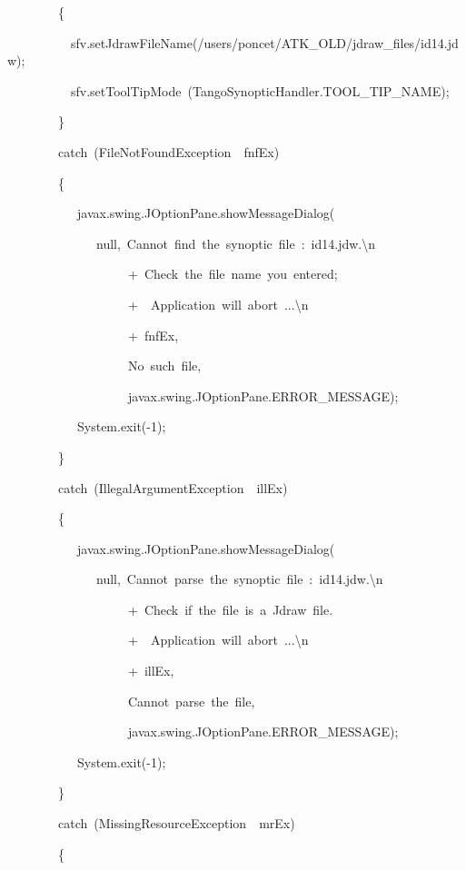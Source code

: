 \begin{lyxcode}
~~~~~~~~\{~~~~~

~~~~~~~~~~sfv.setJdrawFileName(\textquotedbl{}/users/poncet/ATK\_OLD/jdraw\_files/id14.jdw\textquotedbl{});

~~~~~~~~~~sfv.setToolTipMode~(TangoSynopticHandler.TOOL\_TIP\_NAME);

~~~~~~~~\}

~~~~~~~~catch~(FileNotFoundException~~fnfEx)

~~~~~~~~\{

~~~~~~~~~~~javax.swing.JOptionPane.showMessageDialog(

~~~~~~~~~~~~~~null,~\textquotedbl{}Cannot~find~the~synoptic~file~:~id14.jdw.\textbackslash{}n\textquotedbl{}

~~~~~~~~~~~~~~~~~~~+~\textquotedbl{}Check~the~file~name~you~entered;\textquotedbl{}

~~~~~~~~~~~~~~~~~~~+~\textquotedbl{}~Application~will~abort~...\textbackslash{}n\textquotedbl{}

~~~~~~~~~~~~~~~~~~~+~fnfEx,

~~~~~~~~~~~~~~~~~~~\textquotedbl{}No~such~file\textquotedbl{},

~~~~~~~~~~~~~~~~~~~javax.swing.JOptionPane.ERROR\_MESSAGE);

~~~~~~~~~~~System.exit(-1);

~~~~~~~~\}

~~~~~~~~catch~(IllegalArgumentException~~illEx)

~~~~~~~~\{

~~~~~~~~~~~javax.swing.JOptionPane.showMessageDialog(

~~~~~~~~~~~~~~null,~\textquotedbl{}Cannot~parse~the~synoptic~file~:~id14.jdw.\textbackslash{}n\textquotedbl{}

~~~~~~~~~~~~~~~~~~~+~\textquotedbl{}Check~if~the~file~is~a~Jdraw~file.\textquotedbl{}

~~~~~~~~~~~~~~~~~~~+~\textquotedbl{}~Application~will~abort~...\textbackslash{}n\textquotedbl{}

~~~~~~~~~~~~~~~~~~~+~illEx,

~~~~~~~~~~~~~~~~~~~\textquotedbl{}Cannot~parse~the~file\textquotedbl{},

~~~~~~~~~~~~~~~~~~~javax.swing.JOptionPane.ERROR\_MESSAGE);

~~~~~~~~~~~System.exit(-1);

~~~~~~~~\}

~~~~~~~~catch~(MissingResourceException~~mrEx)

~~~~~~~~\{


\end{lyxcode}
